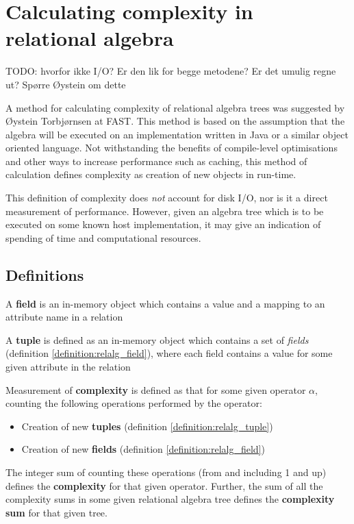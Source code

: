 \section{Calculating complexity in relational algebra}
\label{sect:method:complexity}
TODO: hvorfor ikke I/O? Er den lik for begge metodene? Er det umulig \a regne
ut? Sp\o rre \O ystein om dette

A method for calculating complexity of relational algebra trees was suggested
by \O ystein Torbj\o rnsen at FAST. This method is based on the assumption
that the algebra will be executed on an implementation written in Java or a
similar object oriented language. Not withstanding the benefits of compile-level
optimisations and other ways to increase performance such as caching, this
method of calculation defines complexity as creation of new objects in run-time. 

This definition of complexity does \textit{not} account
for disk I/O, nor is it a direct measurement of performance. However, given
an algebra tree which is to be executed on some known host implementation, it
may give an indication of spending of time and computational resources.

\subsection{Definitions}
\begin{myDefinition}
A \textbf{field} is an in-memory object which contains a value and a mapping to
an attribute name in a relation
\label{definition:relalg_field}
\end{myDefinition}

\begin{myDefinition}
A \textbf{tuple} is defined as an in-memory object which contains a set of
\textit{fields} (definition \ref{definition:relalg_field}), where each field
contains a value for some given attribute in the relation
\label{definition:relalg_tuple}
\end{myDefinition}

\begin{myDefinition}
Measurement of \textbf{complexity} is defined as that for some given operator
$\alpha$, counting the following operations performed by the operator:
\begin{itemize}
  \item Creation of new \textbf{tuples} (definition
  \ref{definition:relalg_tuple})
  \item Creation of new \textbf{fields} (definition
  \ref{definition:relalg_field})
\end{itemize}
The integer sum of counting these operations (from and including 1 and up)
defines the \textbf{complexity} for that given operator. Further, the sum of
all the complexity sums in some given relational algebra tree defines the
\textbf{complexity sum} for that given tree.
\label{definition:relalg_complexity}
\end{myDefinition}

